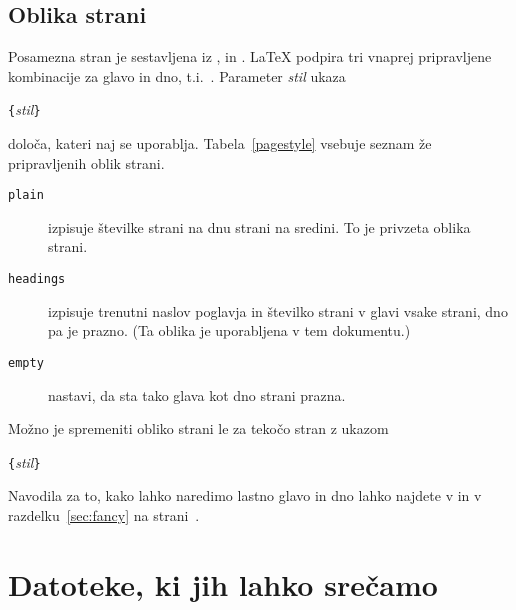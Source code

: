\subsection{Oblika strani}
 
Posamezna stran je sestavljena iz ,  in .
\LaTeX{} podpira tri vnaprej pripravljene kombinacije za glavo in dno, 
t.i.~. Parameter \emph{stil} ukaza 
\begin{lscommand}
\verb|{|\emph{stil}\verb|}|
\end{lscommand}
\noindent določa, kateri naj se uporablja.
Tabela~\ref{pagestyle}
vsebuje seznam že pripravljenih oblik strani.

\begin{table}[!hbp]
\caption{Vnaprej pripravljene oblike strani v \LaTeX{}u.} \label{pagestyle}
\begin{lined}{12cm}
\begin{description}

\item[\normalfont\texttt{plain}] izpisuje številke strani na dnu strani na sredini. To je privzeta oblika strani.

\item[\normalfont\texttt{headings}] izpisuje trenutni naslov poglavja in številko strani v glavi vsake strani,
  dno pa je prazno. (Ta oblika je uporabljena v tem dokumentu.)
\item[\normalfont\texttt{empty}] nastavi, da sta tako glava kot dno strani prazna.

\end{description}
\end{lined}
\end{table}

Možno je spremeniti obliko strani le za tekočo stran z ukazom
\begin{lscommand}
\verb|{|\emph{stil}\verb|}|
\end{lscommand}
Navodila za to, kako lahko naredimo lastno glavo in dno lahko najdete v \companion{} 
in v razdelku~\ref{sec:fancy} na strani~\pageref{sec:fancy}.
%


\section{Datoteke, ki jih lahko srečamo}


